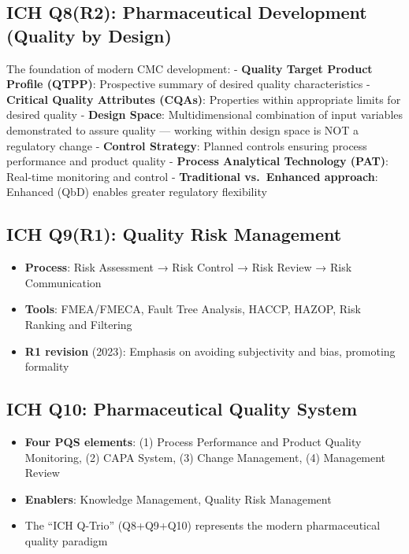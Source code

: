 \documentclass[
  11pt,
  a4paper,
]{report}
\providecommand{\tightlist}{%
  \setlength{\itemsep}{0pt}\setlength{\parskip}{0pt}}
\begin{document}
\hypertarget{ich-q8r2-pharmaceutical-development-quality-by-design}{%
\subsection{ICH Q8(R2): Pharmaceutical Development (Quality by
Design)}\label{ich-q8r2-pharmaceutical-development-quality-by-design}}

The foundation of modern CMC development: - \textbf{Quality Target
Product Profile (QTPP)}: Prospective summary of desired quality
characteristics - \textbf{Critical Quality Attributes (CQAs)}:
Properties within appropriate limits for desired quality -
\textbf{Design Space}: Multidimensional combination of input variables
demonstrated to assure quality --- working within design space is NOT a
regulatory change - \textbf{Control Strategy}: Planned controls ensuring
process performance and product quality - \textbf{Process Analytical
Technology (PAT)}: Real-time monitoring and control -
\textbf{Traditional vs.~Enhanced approach}: Enhanced (QbD) enables
greater regulatory flexibility

\hypertarget{ich-q9r1-quality-risk-management}{%
\subsection{ICH Q9(R1): Quality Risk
Management}\label{ich-q9r1-quality-risk-management}}

\begin{itemize}
\tightlist
\item
  \textbf{Process}: Risk Assessment → Risk Control → Risk Review → Risk
  Communication
\item
  \textbf{Tools}: FMEA/FMECA, Fault Tree Analysis, HACCP, HAZOP, Risk
  Ranking and Filtering
\item
  \textbf{R1 revision} (2023): Emphasis on avoiding subjectivity and
  bias, promoting formality
\end{itemize}

\hypertarget{ich-q10-pharmaceutical-quality-system}{%
\subsection{ICH Q10: Pharmaceutical Quality
System}\label{ich-q10-pharmaceutical-quality-system}}

\begin{itemize}
\tightlist
\item
  \textbf{Four PQS elements}: (1) Process Performance and Product
  Quality Monitoring, (2) CAPA System, (3) Change Management, (4)
  Management Review
\item
  \textbf{Enablers}: Knowledge Management, Quality Risk Management
\item
  The ``ICH Q-Trio'' (Q8+Q9+Q10) represents the modern pharmaceutical
  quality paradigm
\end{itemize}
\end{document}
